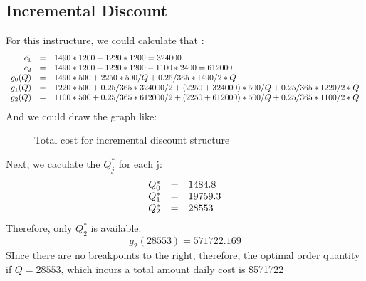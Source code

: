 \documentclass[a4paper,12pt]{journal}
\begin{document}
\subsection*{Incremental Discount}
For this instructure, we could calculate that :
\begin{equation}
	\begin{array}{r c l}
		\bar{c_1}&=&1490*1200-1220*1200=324000\\
		\bar{c_2}&=&1490*1200+1220*1200-1100*2400=612000\\
	g_0(Q)&=&1490*500+2250*500/Q+0.25/365*1490/2*Q\\
	g_1(Q)&=&1220*500+0.25/365*324000/2+(2250+324000)*500/Q+0.25/365*1220/2*Q\\
	g_2(Q)&=&1100*500+0.25/365*612000/2+(2250+612000)*500/Q+0.25/365*1100/2*Q\\
	\end{array}
\end{equation}
And we could draw the graph like:
\begin{figure}[h]
	\caption{Total cost for incremental discount structure}
\end{figure}
Next, we caculate the $Q_j^\ast$ for each j:
\begin{equation}
	\begin{array}{r c l}
		Q_0^\ast&=&1484.8\\
		Q_1^\ast&=&19759.3\\
		Q_2^\ast&=&28553\\
	\end{array}
\end{equation}
Therefore, only $Q_2^\ast$ is available.
$$g_2(28553)=571722.169$$
SInce there are no breakpoints to the right, therefore, the optimal order quantity if $Q=28553$, which incurs a total amount daily cost is \$571722
\end{document}

